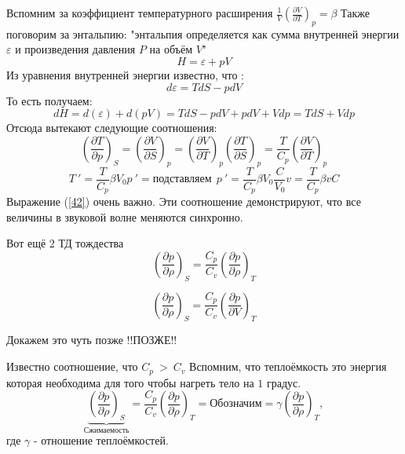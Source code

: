 \documentclass[14pt,a4paper,oneside]{extarticle}	%
\newcommand{\bracket}[1] {\left( #1 \right) } %
\newcommand{\dd}[1] {\partial #1 }
\begin{document}
Вспомним за коэффициент температурного расширения $ \frac{1}{V}\bracket{\frac{\partial V}{\partial T}}_{p} = \beta  $ 
Также поговорим за энтальпию:
"энтальпия определяется как сумма внутренней энергии $ \varepsilon $ и произведения давления $ P $ на объём $ V $"
 \begin{equation}\label{38}
H = \varepsilon + pV
\end{equation}
Из уравнения внутренней энергии известно, что :
\begin{equation}\label{39}
d\varepsilon = TdS - pdV
\end{equation}
То есть получаем:
\begin{equation}\label{40}
dH = d(\varepsilon) + d(pV) = TdS - pdV + pdV +Vdp = TdS + Vdp
\end{equation}
Отсюда вытекают следующие соотношения:
\begin{equation}\label{41}
 \bracket{\frac{\partial T}{\partial p}}_{S} = \bracket{\frac{\partial V}{\partial S}}_{p} = \bracket{\frac{\partial V}{\partial T}}_{p}\bracket{\frac{\partial T}{\partial S}}_{p} = \frac{T}{C_{p}}\bracket{\frac{\partial V}{\partial T}}_{p}
\end{equation}
\begin{equation}\label{42}
T\:' = \frac{T}{C_{p}}\beta V_{0}p\:' = \text{подставляем}\:\: p\:'=  \frac{T}{C_{p}}\beta V_{0}\frac{C}{V_{0}}v = \frac{T}{C_{p}}\beta v C 
\end{equation}
Выражение (\ref{42}) очень важно. 
Эти соотношение демонстрируют, что все величины в звуковой волне меняются синхронно.

Вот ещё 2 ТД тождества 
\begin{equation}\label{43}
\bracket{\frac{\partial p}{\partial \rho}}_{S} = \frac{C_{p}}{C_{v}}\bracket{\frac{\dd{p}}{\dd{\rho}}}_{T}
\end{equation}

\begin{equation}\label{43.1}
\bracket{\frac{\partial p}{\partial \rho}}_{S} = \frac{C_{p}}{C_{v}}\bracket{\frac{\dd{p}}{\dd{V}}}_{T}
\end{equation}

Докажем это чуть позже !!ПОЗЖЕ!!


Известно соотношение, что $ C_{p}\: > \: C_{v} $
Вспомним, что теплоёмкость это энергия которая необходима для того чтобы нагреть тело на $ 1 $ градус. 
\begin{equation*}
\underbrace{\bracket{\frac{\partial p}{\partial \rho}}_{S}}_{\text{Сжимаемость}} = \frac{C_{p}}{C_{v}}\bracket{\frac{\dd{p}}{\dd{\rho}}}_{T} = \text{Обозначим} = \gamma\bracket{\frac{\dd{p}}{\dd{\rho}}}_{T},
\end{equation*}
где $ \gamma $ - отношение теплоёмкостей.
\end{document}
